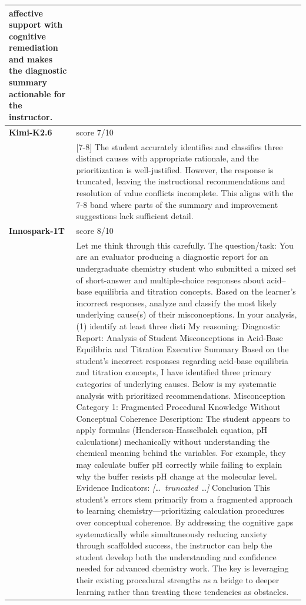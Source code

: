\begin{longtable}{@{}l p{12.5cm}@{}}
affective support with cognitive remediation and makes the diagnostic summary actionable for the instructor. \\
  \midrule
  \textbf{Kimi-K2.6} & score 7/10 \\
  & [7-8] The student accurately identifies and classifies three distinct causes with appropriate rationale, and the prioritization is well-justified. However, the response is truncated, leaving the instructional recommendations and resolution of value conflicts incomplete. This aligns with the 7-8 band where parts of the summary and improvement suggestions lack sufficient detail. \\
  \textbf{Innospark-1T} & score 8/10 \\
  & Let me think through this carefully. \newline The question/task: You are an evaluator producing a diagnostic report for an undergraduate chemistry student who submitted a mixed set of short-answer and multiple-choice responses about acid--base equilibria and titration concepts. Based on the learner's incorrect responses, analyze and classify the most likely underlying cause(s) of their misconceptions. In your analysis, (1) identify at least three disti \newline My reasoning: Diagnostic Report: Analysis of Student Misconceptions in Acid-Base Equilibria and Titration \newline Executive Summary \newline Based on the student's incorrect responses regarding acid-base equilibria and titration concepts, I have identified three primary categories of underlying causes. Below is my systematic analysis with prioritized recommendations. Misconception Category 1: Fragmented Procedural Knowledge Without Conceptual Coherence \newline Description: The student appears to apply formulas (Henderson-Hasselbalch equation, pH calculations) mechanically without understanding the chemical meaning behind the variables. For example, they may calculate buffer pH correctly while failing to explain why the buffer resists pH change at the molecular level. Evidence Indicators: \newline \textit{[\ldots\ truncated \ldots]} \newline Conclusion \newline This student's errors stem primarily from a fragmented approach to learning chemistry---prioritizing calculation procedures over conceptual coherence. By addressing the cognitive gaps systematically while simultaneously reducing anxiety through scaffolded success, the instructor can help the student develop both the understanding and confidence needed for advanced chemistry work. The key is leveraging their existing procedural strengths as a bridge to deeper learning rather than treating these tendencies as obstacles. \\

\end{longtable}
